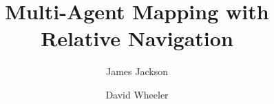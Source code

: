 \documentclass{article}
\title{Multi-Agent Mapping with Relative Navigation}
\author{James Jackson}
\author{David Wheeler}
\begin{document}
\maketitle


\begin{abstract}
  
\end{abstract}

\begin{spacing}{1.5}







\end{spacing}

%
%



\end{document}
